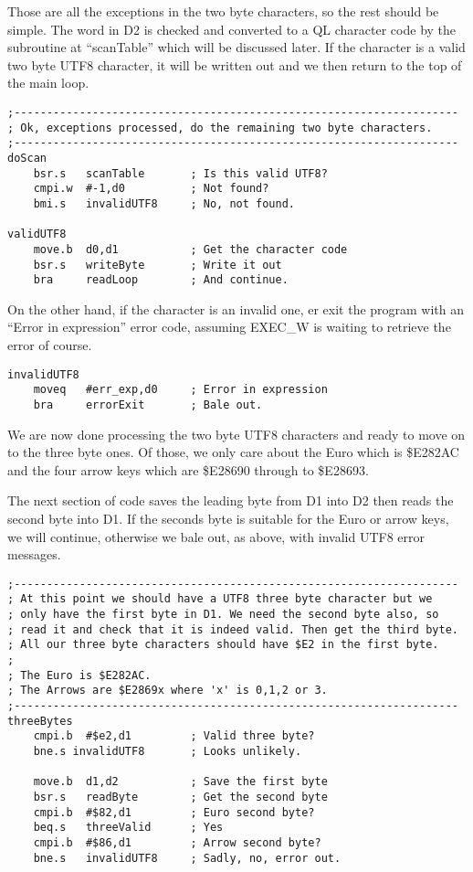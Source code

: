 Those are all the exceptions in the two byte characters, so the rest
should be simple. The word in D2 is checked and converted to a QL
character code by the subroutine at ``scanTable'' which will be
discussed later. If the character is a valid two byte UTF8 character,
it will be written out and we then return to the top of the main loop.

\begin{lstlisting}[firstnumber=last,caption={Utf82Ql: Two byte UTF8 character handling}]
;--------------------------------------------------------------------
; Ok, exceptions processed, do the remaining two byte characters.
;--------------------------------------------------------------------
doScan
    bsr.s   scanTable       ; Is this valid UTF8?
    cmpi.w  #-1,d0          ; Not found?
    bmi.s   invalidUTF8     ; No, not found.

validUTF8
    move.b  d0,d1           ; Get the character code
    bsr.s   writeByte       ; Write it out
    bra     readLoop        ; And continue.
\end{lstlisting}

On the other hand, if the character is an invalid one, er exit the
program with an ``Error in expression'' error code, assuming EXEC\_W
is waiting to retrieve the error of course.

\begin{lstlisting}[firstnumber=last,caption={Utf82Ql: Invalid UTF8 character detected}]
invalidUTF8
    moveq   #err_exp,d0     ; Error in expression
    bra     errorExit       ; Bale out.
\end{lstlisting}

We are now done processing the two byte UTF8 characters and ready
to move on to the three byte ones. Of those, we only care about the
Euro which is \$E282AC and the four arrow keys which are \$E28690
through to \$E28693.

The next section of code saves the leading byte from D1 into D2 then
reads the second byte into D1. If the seconds byte is suitable for
the Euro or arrow keys, we will continue, otherwise we bale out, as
above, with invalid UTF8 error messages.

\begin{lstlisting}[firstnumber=last,caption={Utf82Ql: Three byte UTF8 character handling}]
;--------------------------------------------------------------------
; At this point we should have a UTF8 three byte character but we 
; only have the first byte in D1. We need the second byte also, so 
; read it and check that it is indeed valid. Then get the third byte.
; All our three byte characters should have $E2 in the first byte.
;
; The Euro is $E282AC.
; The Arrows are $E2869x where 'x' is 0,1,2 or 3.
;--------------------------------------------------------------------
threeBytes
    cmpi.b  #$e2,d1         ; Valid three byte?
    bne.s invalidUTF8       ; Looks unlikely.

    move.b  d1,d2           ; Save the first byte
    bsr.s   readByte        ; Get the second byte
    cmpi.b  #$82,d1         ; Euro second byte?
    beq.s   threeValid      ; Yes
    cmpi.b  #$86,d1         ; Arrow second byte?
    bne.s   invalidUTF8     ; Sadly, no, error out.
\end{lstlisting}

